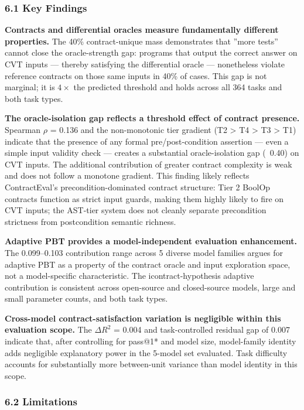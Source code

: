 
\subsubsection{6.1 Key Findings}

\textbf{Contracts and differential oracles measure fundamentally different properties.} The 40\% contract-unique mass demonstrates that ''more tests'' cannot close the oracle-strength gap: programs that output the correct answer on CVT inputs --- thereby satisfying the differential oracle --- nonetheless violate reference contracts on those same inputs in 40\% of cases. This gap is not marginal; it is $4\times$ the predicted threshold and holds across all 364 tasks and both task types.

\textbf{The oracle-isolation gap reflects a threshold effect of contract presence.} Spearman $\rho$ = 0.136 and the non-monotonic tier gradient (T2 > T4 > T3 > T1) indicate that the presence of any formal pre/post-condition assertion --- even a simple input validity check --- creates a substantial oracle-isolation gap (~0.40) on CVT inputs. The additional contribution of greater contract complexity is weak and does not follow a monotone gradient. This finding likely reflects ContractEval's precondition-dominated contract structure: Tier 2 BoolOp contracts function as strict input guards, making them highly likely to fire on CVT inputs; the AST-tier system does not cleanly separate precondition strictness from postcondition semantic richness.

\textbf{Adaptive PBT provides a model-independent evaluation enhancement.} The 0.099--0.103 contribution range across 5 diverse model families argues for adaptive PBT as a property of the contract oracle and input exploration space, not a model-specific characteristic. The icontract-hypothesis adaptive contribution is consistent across open-source and closed-source models, large and small parameter counts, and both task types.

\textbf{Cross-model contract-satisfaction variation is negligible within this evaluation scope.} The $\Delta R^2$ = 0.004 and task-controlled residual gap of 0.007 indicate that, after controlling for pass@1* and model size, model-family identity adds negligible explanatory power in the 5-model set evaluated. Task difficulty accounts for substantially more between-unit variance than model identity in this scope.

\subsubsection{6.2 Limitations}

